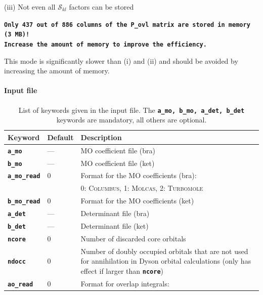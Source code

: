 \documentclass[a4paper,10pt,DIV=15,openany,twoside=false]{scrbook}
\newcommand{\ttt}[1]{\textbf{\texttt{#1}}}
\newenvironment{example}{
  \setlength{\OuterFrameSep}{3pt}
  \vspace{0mm}
  \definecolor{shadecolor}{HTML}{E4F4FF}
  \begin{shaded}
}{
  \end{shaded}
}
\begin{document}
(iii) Not even all $\mathcal{S}_{kl}$ factors can be stored
\begin{example}
\ttt{Only 437 out of 886 columns of the P\_ovl matrix are stored in memory (3 MB)!\\
 Increase the amount of memory to improve the efficiency.}
\end{example}
This mode is significantly slower than (i) and (ii) and should be avoided by increasing the amount of memory.

\paragraph{Input file}

\begin{table}[tb]
  \caption{List of keywords given in the input file. The \ttt{a\_mo, b\_mo, a\_det, b\_det} keywords are mandatory, all others are optional.}
  \label{tab:key_wfo}
  \begin{tabular}{llp{9cm}}
    \hline
    Keyword & Default & Description \\
    \hline
    \ttt{a\_mo}                 & ---                           & MO coefficient file (bra)\\
    \ttt{b\_mo}                 & ---                           & MO coefficient file (ket)\\
    \ttt{a\_mo\_read}           & 0                             & Format for the MO coefficients (bra):\\
                                                                && 0: \textsc{Columbus}, 1: \textsc{Molcas}, 2: \textsc{Turbomole}\\
    \ttt{b\_mo\_read}           & 0                             & Format for the MO coefficients (ket)\\
    \ttt{a\_det}                & ---                           & Determinant file (bra)\\
    \ttt{b\_det}                & ---                           & Determinant file (ket)\\
    \ttt{ncore}                 & 0                             & Number of discarded core orbitals\\
    \ttt{ndocc}                 & 0                             & Number of doubly occupied orbitals that are not used for 
                                                                annihilation in Dyson orbital calculations (only has effect if larger than \ttt{ncore})\\
    \ttt{ao\_read}              & 0                             & Format for overlap integrals:\\

\end{tabular}
\end{table}
\end{document}
